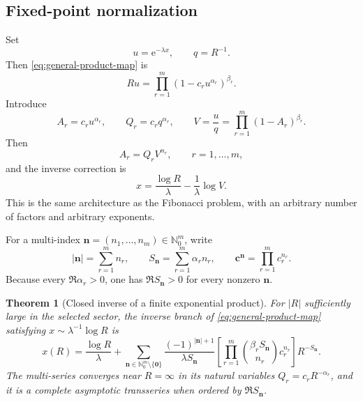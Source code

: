 \documentclass[11pt,oneside]{article}
\numberwithin{equation}{section}
\theoremstyle{plain}
\newtheorem{theorem}{Theorem}[section]
\theoremstyle{definition}
\theoremstyle{remark}
\newcommand{\e}{\mathrm e}
\newcommand{\multi}[1]{\bm{#1}}
\newcommand{\Nzero}{\mathbb N_0}
\begin{document}
\subsection{Fixed-point normalization}

Set
\begin{equation}\label{eq:general-uq}
 u=\e^{-\lambda x},
 \qquad q=R^{-1}.
\end{equation}
Then \cref{eq:general-product-map} is
\begin{equation}\label{eq:general-u-equation}
 Ru=\prod_{r=1}^m(1-c_ru^{\alpha_r})^{\beta_r}.
\end{equation}
Introduce
\begin{equation}\label{eq:general-AQV}
 A_r=c_ru^{\alpha_r},
 \qquad
 Q_r=c_rq^{\alpha_r},
 \qquad
 V=\frac uq=\prod_{r=1}^m(1-A_r)^{\beta_r}.
\end{equation}
Then
\begin{equation}\label{eq:general-fixed-system}
 A_r=Q_rV^{\alpha_r},
 \qquad r=1,\ldots,m,
\end{equation}
and the inverse correction is
\begin{equation}\label{eq:general-delta}
 x=\frac{\log R}{\lambda}-\frac1\lambda\log V.
\end{equation}
This is the same architecture as the Fibonacci problem, with an arbitrary
number of factors and arbitrary exponents.

For a multi-index \(\multi n=(n_1,\ldots,n_m)\in\Nzero^m\), write
\begin{equation}\label{eq:S-multi}
 |\multi n|=\sum_{r=1}^mn_r,
 \qquad
 S_{\multi n}=\sum_{r=1}^m\alpha_rn_r,
 \qquad
 \multi c^{\multi n}=\prod_{r=1}^mc_r^{n_r}.
\end{equation}
Because every \(\Re\alpha_r>0\), one has
\(\Re S_{\multi n}>0\) for every nonzero \(\multi n\).

\begin{theorem}[Closed inverse of a finite exponential product]\label{thm:general-product}
For \(|R|\) sufficiently large in the selected sector, the inverse branch
of \cref{eq:general-product-map} satisfying
\(x\sim\lambda^{-1}\log R\) is
\begin{equation}\label{eq:general-product-inverse}
 \boxed{
 x(R)=\frac{\log R}{\lambda}
 +\sum_{\multi n\in\Nzero^m\setminus\{\multi0\}}
 \frac{(-1)^{|\multi n|+1}}{\lambda S_{\multi n}}
 \left[
   \prod_{r=1}^m
   \binom{\beta_rS_{\multi n}}{n_r}c_r^{n_r}
 \right]
 R^{-S_{\multi n}}.
 }
\end{equation}
The multi-series converges near \(R=\infty\) in its natural variables
\(Q_r=c_rR^{-\alpha_r}\), and it is a complete asymptotic transseries when
ordered by \(\Re S_{\multi n}\).
\end{theorem}
\end{document}
